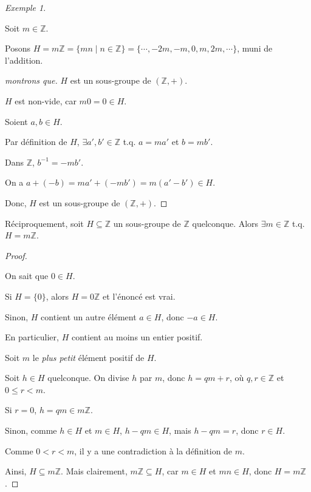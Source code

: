 \documentclass{report}
\newcommand*{\lte}{\leqslant}
\newcommand*{\entiers}{\mathbb{Z}}
\theoremstyle{definition}
\theoremstyle{remark}
\newtheorem*{exem}{Exemple}
\begin{document}
	\begin{exem}~

		Soit $m \in \entiers$.

		Posons $H = m\entiers = \{mn \mid n \in \entiers\} = \{\dotsb,-2m,-m,0,m,2m,\dotsb\}$, muni de l'addition.
		\begin{proof}[montrons que]
			$H$ est un sous-groupe de $(\entiers,+)$.

			$H$ est non-vide, car $m0=0 \in H$.

			Soient $a,b \in H$.

			Par d\'efinition de $H$, $\exists a',b' \in \entiers$ t.q. $a=ma'$ et $b=mb'$.

			Dans $\entiers$, $b^{-1} = -mb'$.

			On a $a+(-b) = ma' + (-mb') = m(a'-b') \in H$.

			Donc, $H$ est un sous-groupe de $(\entiers,+)$.
		\end{proof}

		R\'eciproquement, soit $H \subseteq \entiers$ un sous-groupe de $\entiers$ quelconque. Alors $\exists m \in \entiers$ t.q. $H=m\entiers$.
		\begin{proof}~

			On sait que $0 \in H$.

			Si $H=\{0\}$, alors $H=0\entiers$ et l'\'enonc\'e est vrai.

			Sinon, $H$ contient un autre \'el\'ement $a \in H$, donc $-a \in H$.

			En particulier, $H$ contient au moins un entier positif.

			Soit $m$ le \emph{plus petit} \'el\'ement positif de $H$.

			Soit $h \in H$ quelconque. On divise $h$ par $m$, donc $h=qm+r$, o\`u $q,r \in \entiers$ et $0 \lte r < m$.

			Si $r=0$, $h=qm \in m\entiers$.

			Sinon, comme $h \in H$ et $m \in H$, $h-qm \in H$, mais $h-qm=r$, donc $r \in H$.

			Comme $0<r<m$, il y a une contradiction \`a la d\'efinition de $m$.
			\begin{flushright}
				\lightning
			\end{flushright}

			Ainsi, $H \subseteq m\entiers$. Mais clairement, $m\entiers \subseteq H$, car $m \in H$ et $mn \in H$, donc $H=m\entiers$.
		\end{proof}
	\end{exem}
\end{document}
